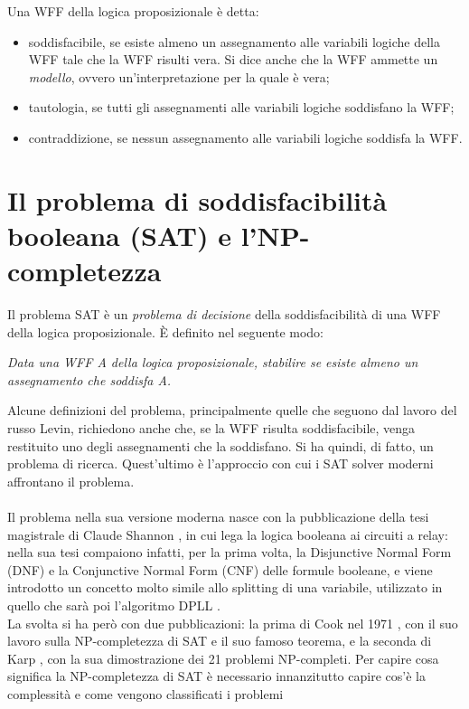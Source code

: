 Una WFF della logica proposizionale è detta:
\begin{itemize}
    \item soddisfacibile, se esiste almeno un assegnamento alle variabili logiche della WFF tale che 
    la WFF risulti vera. Si dice anche che la WFF ammette un \textit{modello}, ovvero un'interpretazione
    per la quale è vera;
    \item tautologia, se tutti gli assegnamenti alle variabili logiche soddisfano la WFF;
    \item contraddizione, se nessun assegnamento alle variabili logiche soddisfa la WFF.
\end{itemize}




\section{Il problema di soddisfacibilità booleana (SAT) e l'NP-completezza}
Il problema SAT è un \textit{problema di decisione} della soddisfacibilità di una WFF della logica proposizionale.
È definito nel seguente modo:
\begin{center}
    \textit{Data una WFF \textnormal{A} della logica proposizionale, stabilire se esiste almeno un assegnamento che soddisfa \textnormal{A}.}
\end{center}
Alcune definizioni del problema, principalmente quelle che seguono dal lavoro del russo Levin, richiedono anche che, 
se la WFF risulta soddisfacibile, venga restituito uno degli assegnamenti che la soddisfano. Si ha quindi, di fatto, un problema
di ricerca.
Quest'ultimo è l'approccio con cui i SAT solver moderni affrontano il problema.\\
\\
Il problema nella sua versione moderna nasce
con la pubblicazione della tesi magistrale di Claude Shannon \cite{shannon-thesis}, in cui lega la logica booleana ai circuiti a relay:
nella sua tesi compaiono infatti, per la prima volta, la Disjunctive Normal Form (DNF) e la Conjunctive Normal Form (CNF) delle formule booleane, e viene introdotto un concetto molto simile allo splitting di una variabile, utilizzato in quello che sarà poi l'algoritmo DPLL .\\
La svolta si ha però con due pubblicazioni: la prima di Cook nel 1971 \cite{theorem-cook}, con il suo lavoro sulla NP-completezza di SAT e 
il suo famoso teorema, e la seconda di Karp \cite{karp-21}, con la sua dimostrazione dei 21 problemi NP-completi.
Per capire cosa significa la NP-completezza di SAT è necessario innanzitutto capire cos'è la complessità e come vengono classificati i problemi 
